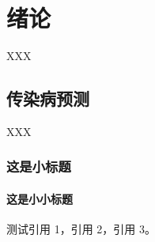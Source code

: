 
\chapter{绪论}
XXX
\section{传染病预测}
XXX
\subsection{这是小标题}
\subsubsection{这是小小标题}
测试引用 1\cite{周融2003}，引用 2\cite{图书馆,李大伦1998,伍蠡甫,张筑生}，引用 3\cite{冯西桥1998,姜锡洲,gbt7714_2006,科学技术期刊管理办法,中国大学学报论文文摘,DUBAR2013--,FOURNEY}。


